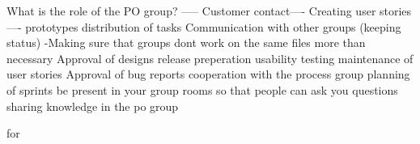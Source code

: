 What is the role of the PO group? -----
Customer contact----
Creating user stories ----
prototypes
distribution of tasks
Communication with other groups (keeping status)
-Making sure that groups dont work on the same files more than necessary
Approval of designs
release preperation
usability testing
maintenance of user stories
Approval of bug reports
cooperation with the process group
planning of sprints
be present in your group rooms so that people can ask you questions
sharing knowledge in the po group




for





